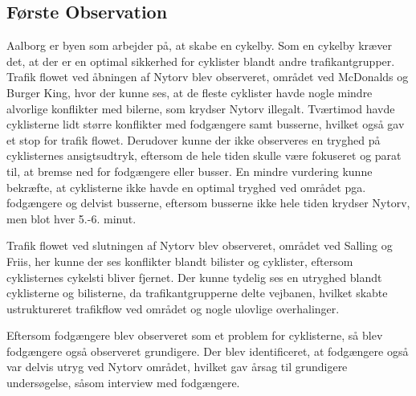 \subsection{Første Observation}
\label{sec:forste_observation}
Aalborg er byen som arbejder på, at skabe en cykelby.%
Som en cykelby kræver det, at der er en optimal sikkerhed for cyklister blandt andre trafikantgrupper. Trafik flowet ved åbningen af Nytorv blev observeret, området ved McDonalds og Burger King, hvor der kunne ses, at de fleste cyklister havde nogle mindre alvorlige konflikter med bilerne, som krydser Nytorv illegalt. Tværtimod havde cyklisterne lidt større konflikter med fodgængere samt busserne, hvilket også gav et stop for trafik flowet. Derudover kunne der ikke observeres en tryghed på cyklisternes ansigtsudtryk, eftersom de hele tiden skulle være fokuseret og parat til, at bremse ned for fodgængere eller busser. En mindre vurdering kunne bekræfte, at cyklisterne ikke havde en optimal tryghed ved området pga. fodgængere og delvist busserne, eftersom busserne ikke hele tiden krydser Nytorv, men blot hver 5.-6. minut.

Trafik flowet ved slutningen af Nytorv blev observeret, området ved Salling og Friis, her kunne der ses konflikter blandt bilister og cyklister, eftersom cyklisternes cykelsti bliver fjernet. Der kunne tydelig ses en utryghed blandt cyklisterne og bilisterne, da trafikantgrupperne delte vejbanen, hvilket skabte ustruktureret trafikflow ved området og nogle ulovlige overhalinger.

Eftersom fodgængere blev observeret som et problem for cyklisterne, så blev fodgængere også observeret grundigere. Der blev identificeret, at fodgængere også var delvis utryg ved Nytorv området, hvilket gav årsag til grundigere undersøgelse, såsom interview med fodgængere.

